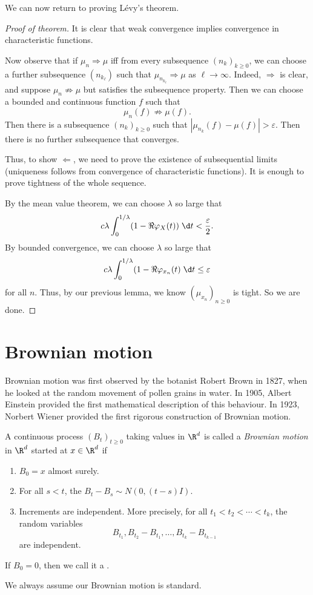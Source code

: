 \documentclass[a4paper]{article}
\begin{document}
We can now return to proving L\'evy's theorem.
\begin{proof}[Proof of theorem]
  It is clear that weak convergence implies convergence in characteristic functions.

  Now observe that if $\mu_n \Rightarrow \mu$ iff from every subsequence $(n_k)_{k \geq 0}$, we can choose a further subsequence $(n_{k_\ell})$ such that $\mu_{n_{k_{\ell}}} \Rightarrow \mu$ as $\ell \to \infty$. Indeed, $\Rightarrow$ is clear, and suppose $\mu_n \not \Rightarrow \mu$ but satisfies the subsequence property. Then we can choose a bounded and continuous function $f$ such that
  \[
    \mu_n(f) \not \Rightarrow \mu(f).
  \]
  Then there is a subsequence $(n_k)_{k \geq 0}$ such that $|\mu_{n_k}(f) - \mu(f)| > \varepsilon$. Then there is no further subsequence that converges.

  Thus, to show $\Leftarrow$, we need to prove the existence of subsequential limits (uniqueness follows from convergence of characteristic functions). It is enough to prove tightness of the whole sequence.

  By the mean value theorem, we can choose $\lambda$ so large that
  \[
    c \lambda \int_0^{1/\lambda} (1 - \Re \varphi_X(t)) \;\d t < \frac{\varepsilon}{2}.
  \]
  By bounded convergence, we can choose $\lambda$ so large that
  \[
    c \lambda \int_0^{1/\lambda} (1 - \Re \varphi_{x_n}(t)\;\d t \leq \varepsilon
  \]
  for all $n$. Thus, by our previous lemma, we know $(\mu_{x_n})_{n \geq 0}$ is tight. So we are done.
\end{proof}

\section{Brownian motion}
Brownian motion was first observed by the botanist Robert Brown in 1827, when he looked at the random movement of pollen grains in water. In 1905, Albert Einstein provided the first mathematical description of this behaviour. In 1923, Norbert Wiener provided the first rigorous construction of Brownian motion.

\begin{defi}
  A continuous process $(B_t)_{t \geq 0}$ taking values in $\R^d$ is called a \emph{Brownian motion} in $\R^d$ started at $x \in \R^d$ if
  \begin{enumerate}
    \item $B_0 = x$ almost surely.
    \item For all $s < t$, the  $B_t - B_s \sim N(0, (t - s) I)$.
    \item Increments are independent. More precisely, for all $t_1 < t_2 < \cdots < t_k$, the random variables
      \[
        B_{t_1}, B_{t_2} - B_{t_1}, \ldots, B_{t_k} - B_{t_{k - 1}}
      \]
      are independent.
  \end{enumerate}
  If $B_0 = 0$, then we call it a .
\end{defi}
We always assume our Brownian motion is standard. 
\end{document}
